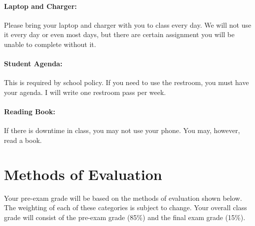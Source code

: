 \documentclass[10pt]{exam}
\begin{document}
\paragraph{Laptop and Charger:}
	Please bring your laptop and charger with you to class every day.  We will not use it every day or even most days, but there are certain assignment you will be unable to complete without it.	

\paragraph{Student Agenda:}
	This is required by school policy.  If you need to use the restroom, you must have your agenda.  I will write one restroom pass per week. 

\paragraph{Reading Book:}
	If there is downtime in class, you may not use your phone.  You may, however, read a book.




\section*{Methods of Evaluation}

Your pre-exam grade will be based on the methods of 
evaluation shown below. The weighting of each of these 
categories is subject to change. Your overall class 
grade will consist of the pre-exam grade (85\%) and the
final exam grade (15\%).
\end{document}
